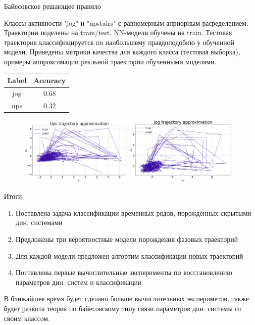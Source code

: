 \documentclass[10pt]{beamer}
\theoremstyle{definition}
\begin{document}
	\begin{frame}{Байесовское решающее правило}
		
		Классы активности "jog" и "upstairs" с равномерным априорным расределением. Траектории поделены на train/test. NN-модели обучены на train. Тестовая траектория классифицируется по наибольшему правдоподобию у обученной модели. Приведены метрики качества для каждого класса (тестовая выборка), примеры аппроксимации реальной траектории обученными моделями.
		
		\begin{table}[]
			\begin{tabular}{|c|c|}
				\hline
				\textbf{Label} & \textbf{Accuracy} \\ \hline
				jog            & 0.68              \\ \hline
				ups            & 0.32              \\ \hline
			\end{tabular}
		\end{table}
		
		\begin{figure}
			\centering
			\includegraphics[width=0.49\textwidth, keepaspectratio]{img/ups_traj_approx.png}
			\includegraphics[width=0.49\textwidth, keepaspectratio]{img/jog_traj_approx.png}
		\end{figure}
		
	\end{frame}
	
	\begin{frame}{Итоги}
		
		\begin{enumerate}
			\item Поставлена задача классификации временных рядов, порождённых скрытыми дин. системами
			\item Предложены три вероятностные модели порождения фазовых траекторий
			\item Для каждой модели предложен алгортим классификации новых траекторий
			\item Поставлены первые вычислительные эксперименты по восстановлению параметров дин. систем и классификации 
		\end{enumerate}
		
		В ближайшее время будет сделано больше вычислительных экспериметов, также будет развита теория по байесовскому типу связи параметров дин. системы со своим классом.
		
	\end{frame}	
	
\end{document}
